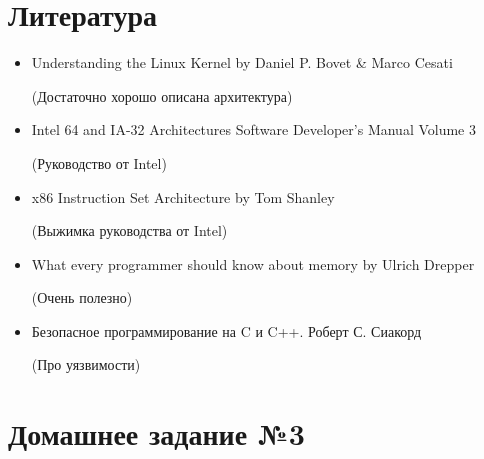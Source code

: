 \documentclass[../../lectures.tex]{subfiles}
\begin{document}
\section{Литература}
\begin{itemize}
    \item Understanding the Linux Kernel by Daniel P. Bovet \& Marco Cesati

          (Достаточно хорошо описана архитектура)
    \item Intel 64 and IA-32 Architectures Software Developer's Manual Volume 3

          (Руководство от Intel)
    \item x86 Instruction Set Architecture by Tom Shanley

          (Выжимка руководства от Intel)
    \item What every programmer should know about memory by Ulrich Drepper

          (Очень полезно)
    \item Безопасное программирование на C и C++. Роберт С. Сиакорд

          (Про уязвимости)
\end{itemize}

\section{Домашнее задание №3}
\todo{}
\end{document}
